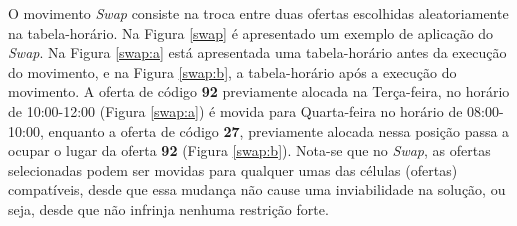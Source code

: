 O movimento \textit{Swap} consiste na troca entre duas ofertas escolhidas aleatoriamente na tabela-horário. Na Figura \ref{swap} é apresentado um exemplo de aplicação do \textit{Swap}. Na Figura \ref{swap:a} está apresentada uma tabela-horário antes da execução do movimento, e na Figura \ref{swap:b}, a tabela-horário após a execução do movimento. A oferta de código \textbf{92} previamente alocada na Terça-feira, no horário de 10:00-12:00 (Figura \ref{swap:a}) é movida para Quarta-feira no horário de 08:00-10:00, enquanto a oferta de código \textbf{27}, previamente alocada nessa posição passa a ocupar o lugar da oferta \textbf{92} (Figura \ref{swap:b}). Nota-se que no \textit{Swap}, as ofertas selecionadas podem ser movidas para qualquer umas das células (ofertas) compatíveis, desde que essa mudança não cause uma inviabilidade na solução, ou seja, desde que não infrinja nenhuma restrição forte. 


